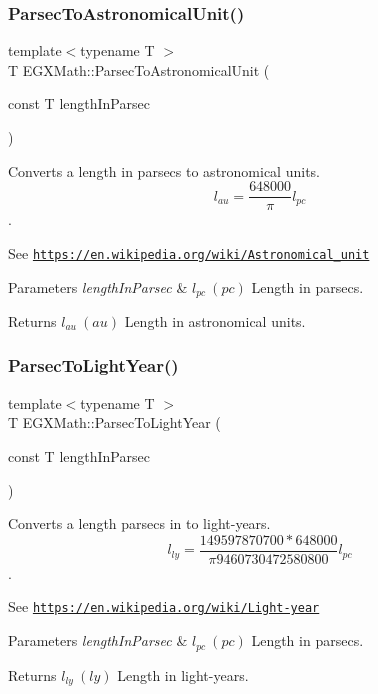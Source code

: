 \subsubsection{\texorpdfstring{Parsec\+To\+Astronomical\+Unit()}{ParsecToAstronomicalUnit()}}
{\footnotesize\ttfamily template$<$typename T $>$ \\
T E\+G\+X\+Math\+::\+Parsec\+To\+Astronomical\+Unit (\begin{DoxyParamCaption}\item[{const T}]{length\+In\+Parsec }\end{DoxyParamCaption})}



Converts a length in parsecs to astronomical units. \[ l_{au}= \frac{648000}{\pi} l_{pc} \]. 

See \href{https://en.wikipedia.org/wiki/Astronomical_unit}{\tt https\+://en.\+wikipedia.\+org/wiki/\+Astronomical\+\_\+unit} 
\begin{DoxyParams}{Parameters}
{\em length\+In\+Parsec} & $ l_{pc}\ (pc)$ Length in parsecs. \\
\hline
\end{DoxyParams}
\begin{DoxyReturn}{Returns}
$ l_{au}\ (au)$ Length in astronomical units. 
\end{DoxyReturn}
\mbox{\label{group___e_g_x_math-_conversions-_length_conversions-_astronomical-_parsec-_astronomical_gaf6681b9c24d89c83c48bf6dabb9a433d}} 
\subsubsection{\texorpdfstring{Parsec\+To\+Light\+Year()}{ParsecToLightYear()}}
{\footnotesize\ttfamily template$<$typename T $>$ \\
T E\+G\+X\+Math\+::\+Parsec\+To\+Light\+Year (\begin{DoxyParamCaption}\item[{const T}]{length\+In\+Parsec }\end{DoxyParamCaption})}



Converts a length parsecs in to light-\/years. \[ l_{ly}= \frac{149597870700 * 648000}{\pi 9460730472580800} l_{pc} \]. 

See \href{https://en.wikipedia.org/wiki/Light-year}{\tt https\+://en.\+wikipedia.\+org/wiki/\+Light-\/year} 
\begin{DoxyParams}{Parameters}
{\em length\+In\+Parsec} & $ l_{pc}\ (pc)$ Length in parsecs. \\
\hline
\end{DoxyParams}
\begin{DoxyReturn}{Returns}
$ l_{ly}\ (ly)$ Length in light-\/years. 
\end{DoxyReturn}
